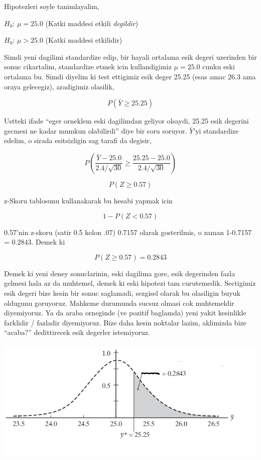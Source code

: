 \documentclass[12pt,fleqn]{article}\usepackage{../common}
\begin{document}
Hipotezleri soyle tanimlayalim,

$H_0$: $\mu = 25.0$ (Katki maddesi etkili {\em degildir})

$H_0$: $\mu > 25.0$ (Katki maddesi etkilidir)

Simdi yeni dagilimi standardize edip, bir hayali ortalama esik degeri
uzerinden bir sonuc cikartalim, standardize etmek icin kullandigimiz $\mu =
25.0$
cunku eski ortalama bu. Simdi diyelim ki test ettigimiz esik deger 25.25
(esas  amac 26.3 ama oraya gelecegiz), aradigimiz olasilik,

$$ P(\bar{Y}  \ge 25.25) $$

Ustteki ifade ``eger orneklem eski dagilimdan geliyor olsaydi, 25.25
esik degerini gecmesi ne kadar mumkun olabilirdi'' diye bir soru
soruyor. $\bar{Y}$'yi standardize edelim, o sirada esitsizligin sag tarafi da
degisir,

$$ P(\frac{\bar{Y} - 25.0}{2.4 / \sqrt{30}} \ge 
\frac{25.25 - 25.0}{2.4 / \sqrt{30}}) 
$$


$$ P(Z \ge 0.57)$$

z-Skoru tablosunu kullanakarak bu hesabi yapmak icin

$$ 1 - P(Z < 0.57)$$

0.57'nin z-skoru (satir 0.5 kolon .07) 0.7157 olarak gosterilmis, o zaman
1-0.7157 = 0.2843. Demek ki

$$ P(Z \ge 0.57) = 0.2843$$

Demek ki yeni deney sonuclarinin, eski dagilima gore, esik degerinden fazla
gelmesi hala az da muhtemel, demek ki eski hipotezi tam
curutemedik. Sectigimiz esik degeri bize kesin bir sonuc saglamadi,
sezgisel olarak bu olasiligin buyuk oldugunu goruyoruz. Mahkeme durumunda
sucsuz olmasi cok muhtemeldir diyemiyoruz. Ya da araba orneginde (ve
pozitif baglamda) yeni yakit kesinlikle farklidir / fazladir
diyemiyoruz. Bize daha kesin noktalar lazim, aklimizda bize ``acaba?''
dedittirecek esik degerler istemiyoruz.

\includegraphics[height=6cm]{carhyp1.png}
\end{document}
